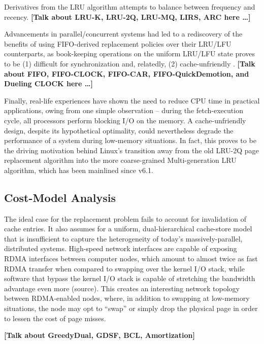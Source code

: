 \documentclass{article}
\begin{document}
Derivatives from the LRU algorithm attempts to balance between frequency and
recency. \textbf{[Talk about LRU-K, LRU-2Q, LRU-MQ, LIRS, ARC here \dots]}

Advancements in parallel/concurrent systems had led to a rediscovery of the benefits
of using FIFO-derived replacement policies over their LRU/LFU counterparts, as
book-keeping operations on the uniform LRU/LFU state proves to be (1) difficult
for synchronization and, relatedly, (2) cache-unfriendly \cite{Yang_etal.FIFO-LPQD.2023}.
\textbf{[Talk about FIFO, FIFO-CLOCK, FIFO-CAR, FIFO-QuickDemotion, and Dueling
CLOCK here \dots]}

Finally, real-life experiences have shown the need to reduce CPU time in practical
applications, owing from one simple observation -- during the fetch-execution
cycle, all processors perform blocking I/O on the memory. A cache-unfriendly
design, despite its hypothetical optimality, could nevertheless degrade the performance
of a system during low-memory situations. In fact, this proves to be the driving
motivation behind Linux's transition away from the old LRU-2Q page replacement
algorithm into the more coarse-grained Multi-generation LRU algorithm, which has
been mainlined since v6.1.

\subsection{Cost-Model Analysis}
The ideal case for the replacement problem fails to account for invalidation of
cache entries. It also assumes for a uniform, dual-hierarchical cache-store model
that is insufficient to capture the heterogeneity of today's massively-parallel,
distributed systems. High-speed network interfaces are capable of exposing RDMA
interfaces between computer nodes, which amount to almost twice as fast RDMA transfer
when compared to swapping over the kernel I/O stack, while software that bypass
the kernel I/O stack is capable of stretching the bandwidth advantage even more
(source). This creates an interesting network topology between RDMA-enabled nodes,
where, in addition to swapping at low-memory situations, the node may opt to ``swap''
or simply drop the physical page in order to lessen the cost of page misses.

\textbf{[Talk about GreedyDual, GDSF, BCL, Amortization]}
\end{document}
